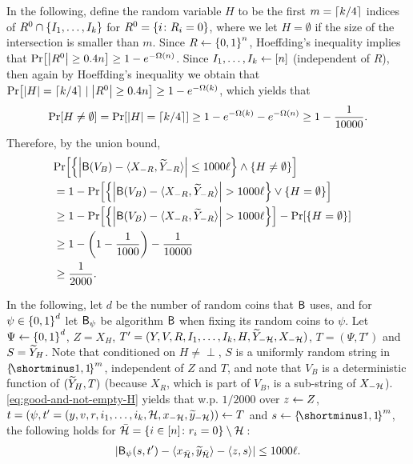 In the following, define the random variable $H$ to be the first $m = \ceil{k/4}$ indices of $R^0 \cap \set{I_1,\ldots,I_k}$ for $R^0 = \set{i \colon R_i = 0}$, where we let $H = \emptyset$ if the size of the intersection is smaller than $m$.
Since $R \la \zo^n$, Hoeffding's inequality implies that $\pr{\size{R^0} \geq 0.4 n} \geq 1 - e^{-\Omega(n)}$. Since $I_1,\ldots,I_k \gets [n]$ (independent of $R$), then again by Hoeffding's inequality we obtain that $\pr{\size{H} = \ceil{k/4} \mid \size{R^0} \geq 0.4 n} \geq 1 - e^{-\Omega(k)}$, which yields that
\begin{align*}
	\pr{H \neq \emptyset} = \pr{\size{H} = \ceil{k/4}} \geq 1 - e^{-\Omega(k)} - e^{-\Omega(n)} \geq 1-\frac1{10000}.
\end{align*}
Therefore, by the union bound,
\begin{align}\label{eq:good-and-not-empty-H}
	\lefteqn{\pr{\set{\size{\Bc(V_B) - \ip{X_{-R}, \tY_{-R}}} \leq 1000 \ell} \land \set{H \neq \emptyset}}}\\
	&= 1- \pr{\set{\size{\Bc(V_B) - \ip{X_{-R}, \tY_{-R}}} > 1000 \ell} \lor \set{H = \emptyset}}\nonumber\\
	&\geq 1- \pr{\set{\size{\Bc(V_B) - \ip{X_{-R}, \tY_{-R}}} > 1000 \ell}} - \pr{ \set{H = \emptyset}}\nonumber\\
    &\geq 1- \paren{1- \frac1{1000}} - \frac1{10000} \nonumber\\
     &\geq \frac1{2000}.\nonumber
\end{align}


In the following, let $d$ be the number of random coins that $\mathsf{B}$ uses, and for $\psi \in \zo^d$ let $\mathsf{B}_{\psi}$ be algorithm $\mathsf{B}$ when fixing its random coins to $\psi$.
Let $\Psi \la \zo^d$,  $Z = X_H$,  $T' = (Y,V,R,I_1,\ldots,I_k, H,\widetilde{Y}_{-{\cal H}}, X_{-{\cal H}})$,  $T= (\Psi, T')$ and $S = \widetilde{Y}_H$. Note  that conditioned on $H \neq \perp$, $S$ is a uniformly random string in $\oo^m$, independent of $Z$ and $T$, and note that $V_B$ is a deterministic function of $(\widetilde{Y}_{H}, T)$ (because $X_R$, which is part of $V_B$, is a sub-string of $X_{-{\cal H}}$).
\cref{eq:good-and-not-empty-H} yields that w.p. $1/2000$ over $z \gets Z$,  $t = (\psi, t'=(y,v,r,i_1,\ldots,i_k,{\cal H},x_{-{\cal H}},\widetilde{y}_{-{\cal H}})) \gets T$ and $s \la \oo^m$,
the following holds for $\bar{\cH} =  \set{i \in [n] \colon r_i = 0} \setminus \cH\:$:
\begin{align*}
	\size{\Bc_{\psi}(s,t') - \ip{x_{\bar{\cH}}, \ty_{\bar{\cH}}} - \ip{z, s}}\leq 1000 \ell.
\end{align*}

